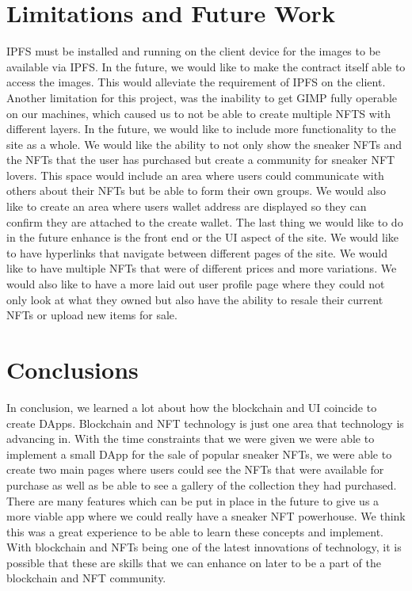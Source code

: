 \documentclass{article}
\begin{document}
\section{Limitations and Future Work}
    IPFS must be installed and running on the client device for the images to be available via IPFS. In the future, we would like to make the contract itself able to access the images. This would alleviate the requirement of IPFS on the client. Another limitation for this project, was the inability to get GIMP fully operable on our machines, which caused us to not be able to create multiple NFTS with different layers.
    \newline
    \indent
    In the future, we would like to include more functionality to the site as a whole. We would like the ability to not only show the sneaker NFTs and the NFTs that the user has purchased but create a community for sneaker NFT lovers. This space would include an area where users could communicate with others about their NFTs but be able to form their own groups. We would also like to create an area where users wallet address are displayed so they can confirm they are attached to the create wallet. 
    \newline
    \indent
    The last thing we would like to do in the future enhance is the front end or the UI aspect of the site. We would like to have hyperlinks that navigate between different pages of the site. We would like to have multiple NFTs that were of different prices and more variations. We would also like to have a more laid out user profile page where they could not only look at what they owned but also have the ability to resale their current NFTs or upload new items for sale.

\section{Conclusions}
    In conclusion, we learned a lot about how the blockchain and UI coincide to create DApps. Blockchain and NFT technology is just one area that technology is advancing in. With the time constraints that we were given we were able to implement a small DApp for the sale of popular sneaker NFTs, we were able to create two main pages where users could see the NFTs that were available for purchase as well as be able to see a gallery of the collection they had purchased. There are many features which can be put in place in the future to give us a more viable app where we could really have a sneaker NFT powerhouse. We think this was a great experience to be able to learn these concepts and implement. With blockchain and NFTs being one of the latest innovations of technology, it is possible that these are skills that we can enhance on later to be a part of the blockchain and NFT community.
\end{document}
